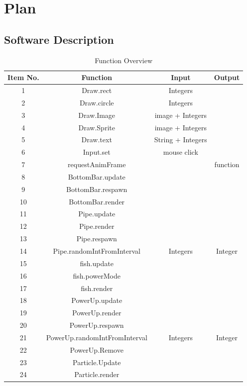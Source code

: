 \documentclass[11pt, oneside]{article}   	%
\begin{document}
\section{Plan}
\subsection{Software Description}
\begin{table}[H]
\caption{Function Overview}
\begin{center}
\begin{tabular}{|c|c|c|c|}
\hline
Item No. & Function & Input & Output\\
\hline
1 &  Draw.rect & Integers & \\
\hline
2 & Draw.circle & Integers & \\
\hline
3 & Draw.Image & image + Integers  & \\
\hline
4 & Draw.Sprite & image + Integers & \\
\hline
5 & Draw.text & String + Integers & \\
\hline
6 & Input.set &  mouse click  & \\
\hline
7 & requestAnimFrame  &  &  function\\
\hline
8 & BottomBar.update &  &\\
\hline
9 &  BottomBar.respawn & & \\
\hline
10 & BottomBar.render &  & \\
\hline
11 & Pipe.update &  & \\
\hline
12 & Pipe.render &  & \\
\hline
13 & Pipe.respawn &  & \\
\hline
14 & Pipe.randomIntFromInterval & Integers & Integer\\
\hline
15 & fish.update &  &\\
\hline
16 & fish.powerMode & & \\
\hline
17 & fish.render &  & \\
\hline
18 & PowerUp.update &  & \\
\hline
19 & PowerUp.render &  & \\
\hline
20 & PowerUp.respawn &  & \\
\hline
21 & PowerUp.randomIntFromInterval & Integers & Integer\\
\hline
22 & PowerUp.Remove &  & \\
\hline
23 & Particle.Update & & \\
\hline
24 &  Particle.render &  & \\
\hline

\end{tabular}
\end{center}
\end{table}
\end{document}
